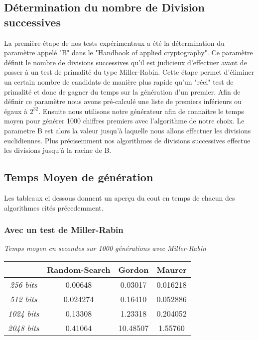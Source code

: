 \documentclass[a4paper,11pt]{article}
\begin{document}
\subsection{Détermination du nombre de Division successives}
La première étape de nos tests expérimentaux a été la détermination du paramètre appelé "B" dans le "Handbook of applied cryptography". Ce paramètre définit le nombre de divisions successives qu'il est judicieux d'effectuer avant de passer à un test de primalité du type Miller-Rabin. Cette étape permet d'éliminer un certain nombre de candidats de manière plus rapide qu'un "réel" test de primalité et donc de gagner du temps sur la génération d'un premier. 
\newline
Afin de définir ce paramètre nous avons pré-calculé une liste de premiers inférieurs ou égaux à $2^{32}$. Ensuite nous utilisons notre générateur afin de connaitre le temps moyen pour générer 1000 chiffres premiers avec l'algorithme de notre choix. Le parametre B est alors la valeur jusqu'à laquelle nous allons effectuer les divisions euclidiennes.
Plus précisemment nos algorithmes de divisions successives effectue les divisions jusqu'à la racine de B. 

\subsection{Temps Moyen de génération} 
Les tableaux ci dessous donnent un aperçu du cout en temps de chacun des algorithmes cités précedemment.

\subsubsection{ Avec un test de Miller-Rabin } 

\begin{center}
\emph{Temps moyen en secondes sur 1000 générations avec Miller-Rabin}
 \begin{tabular}{||c | c | c | c ||} 
 \hline
 \textbf{} & \textbf{Random-Search} & \textbf{Gordon} & \textbf{Maurer} \\ [0.5ex] 
 \hline\hline
 \emph{256 bits} & 0.00648 & 0.03017  & 0.016218 \\ 
 \hline
 \emph{512 bits} & 0.024274 & 0.16410  & 0.052886 \\
 \hline
 \emph{1024 bits}  & 0.13308 & 1.23318 & 0.204052 \\
 \hline
 \emph{2048 bits} & 0.41064 &  10.48507  & 1.55760 \\
 \hline
\end{tabular}
\end{center}
\end{document}
